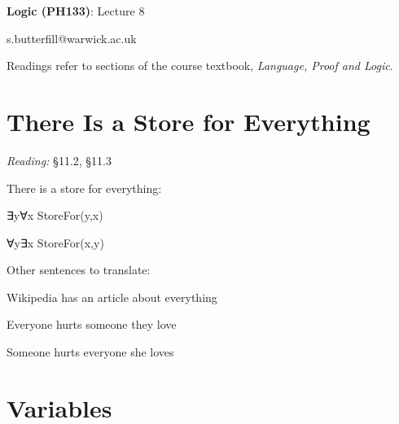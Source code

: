 \documentclass[12pt]{extarticle}
\date{}
\makeatletter
\def \ititle {Origins of Mind}
\def \isubtitle {Lecture 08}
\def \iemail{s.butterfill@warwick.ac.uk}
\makeatother
\begin{document}

\begin{multicols*}{3}

\setlength\footnotesep{1em}







\def \ititle {Logic (PH133)}
 
\def \isubtitle {Lecture 8}
 
\begin{center}
 
{\Large
 
\textbf{\ititle}: \isubtitle
 
}
 
 
 
\iemail %
 
\end{center}
 
Readings refer to sections of the course textbook, \emph{Language, Proof and Logic}.
 
 
 
\section{There Is a Store for Everything}
 
\emph{Reading:} §11.2, §11.3
 
There is a store for everything:
 
\hspace{3mm}	∃y∀x StoreFor(y,x)
 
\hspace{3mm} ∀y∃x StoreFor(x,y)
 
Other sentences to translate:
 
\hspace{3mm} Wikipedia has an article about everything
 
\hspace{3mm} Everyone hurts someone they love
 
\hspace{3mm} Someone hurts everyone she loves
 
 
 
\section{Variables}
 

\end{multicols*}
\end{document}
